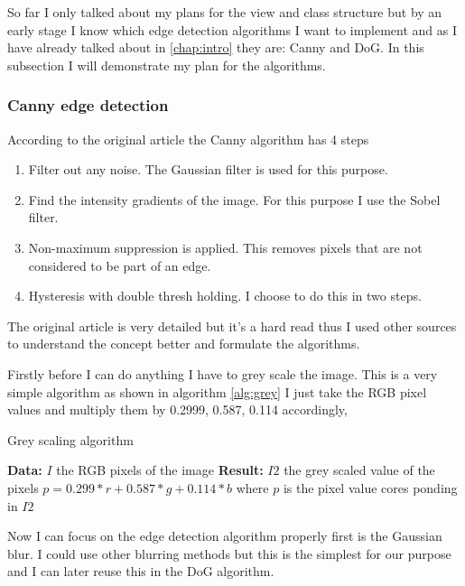 So far I only talked about my plans for the view and class structure but by an early stage I know which edge detection algorithms I want to implement and as I have already talked about in \autoref{chap:intro} they are: \ac{Canny} and \ac{DoG}. In this subsection I will demonstrate my plan for the algorithms.

\subsubsection{Canny edge detection}

According to the original article\cite{canny:paper} the \ac{Canny} algorithm has 4 steps

\begin{enumerate}[nolistsep]
\item Filter out any noise. The Gaussian filter is used for this purpose.
\item Find the intensity gradients of the image. For this purpose I use the Sobel filter.
\item Non-maximum suppression is applied. This removes pixels that are not considered to be part of an edge.
\item Hysteresis with double thresh holding. I choose to do this in two steps.
\end{enumerate}

The original article\cite{canny:paper} is very detailed but it's a hard read thus I used other sources\cite{canny:imp}\cite{canny:imp2} to understand the concept better and formulate the algorithms.

Firstly before I can do anything I have to grey scale the image. This is a very simple algorithm as shown in algorithm \ref{alg:grey} I just take the RGB pixel values and multiply them by 0.2999, 0.587, 0.114 accordingly,

\begin{algorithm}[H]
\caption{Grey scaling algorithm}
\label{alg:grey}
\begin{algorithmic}
\State \textbf{Data:} $I$ the RGB pixels of the image
\State \textbf{Result:} $I2$ the grey scaled value of the pixels
\State $p = 0.299 * r + 0.587 * g + 0.114 * b$
\State where $p$ is the pixel value cores ponding in $I2$
\EndFor
\end{algorithmic}
\end{algorithm}

Now I can focus on the edge detection algorithm properly first is the Gaussian blur. I could use other blurring methods but this is the simplest for our purpose and I can later reuse this in the \ac{DoG} algorithm.

